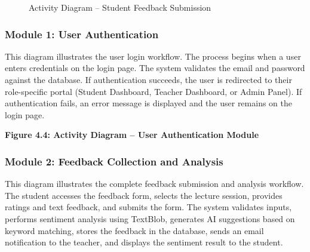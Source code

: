 \begin{figure}[H]
\centering
{}
\caption{Activity Diagram -- Student Feedback Submission}
\label{fig:activity}
\end{figure}

\subsubsection{Module 1: User Authentication}

This diagram illustrates the user login workflow. The process begins when a user enters credentials on the login page. The system validates the email and password against the database. If authentication succeeds, the user is redirected to their role-specific portal (Student Dashboard, Teacher Dashboard, or Admin Panel). If authentication fails, an error message is displayed and the user remains on the login page.

\textbf{Figure 4.4: Activity Diagram -- User Authentication Module}

\subsubsection{Module 2: Feedback Collection and Analysis}

This diagram illustrates the complete feedback submission and analysis workflow. The student accesses the feedback form, selects the lecture session, provides ratings and text feedback, and submits the form. The system validates inputs, performs sentiment analysis using TextBlob, generates AI suggestions based on keyword matching, stores the feedback in the database, sends an email notification to the teacher, and displays the sentiment result to the student.

